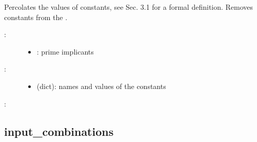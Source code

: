 \documentclass[letterpaper,10pt,english]{sphinxmanual}
\begin{document}
\begin{fulllineitems}
\label{\detokenize{PrimeImplicants:PyBoolNet.PrimeImplicants.percolate_and_remove_constants}}
Percolates the values of constants, see {\hyperref[\detokenize{Bibliography:klarner2015approx}]{}} Sec. 3.1 for a formal definition.
Removes constants from the .
\begin{description}
\item[{:}] \leavevmode\begin{itemize}
\item {} 
: prime implicants

\end{itemize}

\item[{:}] \leavevmode\begin{itemize}
\item {} 
 (dict): names and values of the constants

\end{itemize}

\end{description}

:

\begin{sphinxVerbatim}[commandchars=\\\{\}]
  
\end{sphinxVerbatim}

\end{fulllineitems}



\subsection{input\_combinations}
\label{\detokenize{PrimeImplicants:id18}}\label{\detokenize{PrimeImplicants:input-combinations}}
\end{document}
